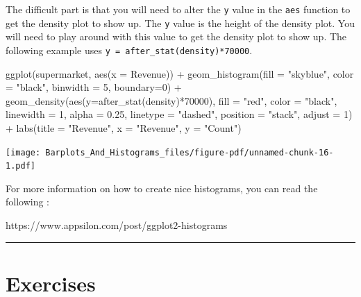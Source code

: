 \documentclass[
  letterpaper,
  DIV=11,
  numbers=noendperiod]{scrreprt}
\newenvironment{Shaded}{\begin{snugshade}}{\end{snugshade}}
\newcommand{\AttributeTok}[1]{\textcolor[rgb]{0.40,0.45,0.13}{#1}}
\newcommand{\DecValTok}[1]{\textcolor[rgb]{0.68,0.00,0.00}{#1}}
\newcommand{\FloatTok}[1]{\textcolor[rgb]{0.68,0.00,0.00}{#1}}
\newcommand{\FunctionTok}[1]{\textcolor[rgb]{0.28,0.35,0.67}{#1}}
\newcommand{\NormalTok}[1]{\textcolor[rgb]{0.00,0.23,0.31}{#1}}
\newcommand{\SpecialCharTok}[1]{\textcolor[rgb]{0.37,0.37,0.37}{#1}}
\newcommand{\StringTok}[1]{\textcolor[rgb]{0.13,0.47,0.30}{#1}}
\begin{document}
The difficult part is that you will need to alter the \texttt{y} value
in the \texttt{aes} function to get the density plot to show up. The
\texttt{y} value is the height of the density plot. You will need to
play around with this value to get the density plot to show up. The
following example uses \texttt{y\ =\ after\_stat(density)*70000}.

\begin{Shaded}
\begin{Highlighting}[]
\FunctionTok{ggplot}\NormalTok{(supermarket, }\FunctionTok{aes}\NormalTok{(}\AttributeTok{x =} \StringTok{\textasciigrave{}}\AttributeTok{Revenue}\StringTok{\textasciigrave{}}\NormalTok{)) }\SpecialCharTok{+}
  \FunctionTok{geom\_histogram}\NormalTok{(}\AttributeTok{fill =} \StringTok{"skyblue"}\NormalTok{, }\AttributeTok{color =} \StringTok{"black"}\NormalTok{, }\AttributeTok{binwidth =} \DecValTok{5}\NormalTok{, }\AttributeTok{boundary=}\DecValTok{0}\NormalTok{) }\SpecialCharTok{+}
  \FunctionTok{geom\_density}\NormalTok{(}\FunctionTok{aes}\NormalTok{(}\AttributeTok{y=}\FunctionTok{after\_stat}\NormalTok{(density)}\SpecialCharTok{*}\DecValTok{70000}\NormalTok{), }\AttributeTok{fill =} \StringTok{"red"}\NormalTok{, }\AttributeTok{color =} \StringTok{"black"}\NormalTok{, }
               \AttributeTok{linewidth =} \DecValTok{1}\NormalTok{, }\AttributeTok{alpha =} \FloatTok{0.25}\NormalTok{, }\AttributeTok{linetype =} \StringTok{"dashed"}\NormalTok{, }
               \AttributeTok{position =} \StringTok{"stack"}\NormalTok{, }\AttributeTok{adjust =} \DecValTok{1}\NormalTok{) }\SpecialCharTok{+}
  \FunctionTok{labs}\NormalTok{(}\AttributeTok{title =} \StringTok{"Revenue"}\NormalTok{,}
       \AttributeTok{x =} \StringTok{"Revenue"}\NormalTok{,}
       \AttributeTok{y =} \StringTok{"Count"}\NormalTok{)}
\end{Highlighting}
\end{Shaded}

\texttt{[image: Barplots\_And\_Histograms\_files/figure-pdf/unnamed-chunk-16-1.pdf]}

For more information on how to create nice histograms, you can read the
following :

https://www.appsilon.com/post/ggplot2-histograms

\begin{center}\rule{0.5\linewidth}{0.5pt}\end{center}

\section*{Exercises}\label{exercises-3}
\end{document}
